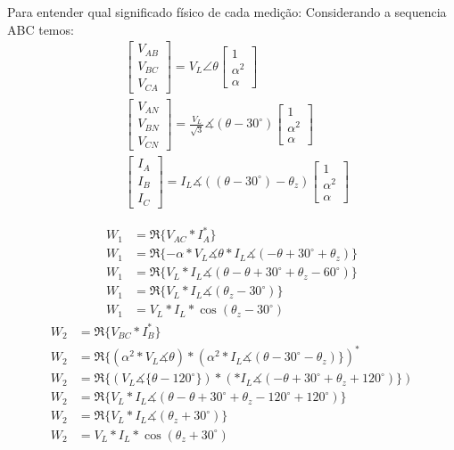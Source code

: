 \documentclass[a4paper, 12pt]{article}
\begin{document}
    Para entender qual significado físico de cada medição:
        Considerando a sequencia ABC temos:
\[ \begin{split}
&\begin{bmatrix} V_{AB}\\ V_{BC}\\ V_{CA} \end{bmatrix} = V_L \angle \theta \begin{bmatrix} 1\\  \alpha^2\\  \alpha \end{bmatrix}\\
&\begin{bmatrix} V_{AN}\\ V_{BN}\\ V_{CN} \end{bmatrix} = \frac{V_L}{\sqrt{3}} \measuredangle{( \theta-30^\circ)} \begin{bmatrix} 1\\  \alpha^2\\  \alpha \end{bmatrix} \\
&\begin{bmatrix} I_{A}\\ I_{B}\\ I_{C} \end{bmatrix} = I_L\measuredangle{(( \theta-30^\circ) - \theta_z)} \begin{bmatrix} 1\\  \alpha^2\\  \alpha \end{bmatrix}
\end{split}
\]

\[\begin{split}
W_1 &= \Re\{V_{AC} \ast I_A^\ast\}\\
W_1 &= \Re\{-\alpha \ast V_L\measuredangle{\theta} \ast I_L\measuredangle{(-\theta+30^\circ+\theta_z)}\}\\
W_1 &= \Re\{V_L\ast I_L\measuredangle{(\theta-\theta+30^\circ+\theta_z - 60^\circ)}\}\\
W_1 &= \Re\{V_L\ast I_L\measuredangle{(\theta_z - 30^\circ)}\}\\
W_1 &= V_L\ast I_L \ast \cos(\theta _z - 30^\circ)
\end{split}\]
\[
\begin{split}
    W_2 &= \Re\{V_{BC} \ast I_B^\ast\}\\
    W_2 &= \Re\{(\alpha^2 \ast V_L\measuredangle{\theta})\ast (\alpha^2 \ast I_L\measuredangle{(\theta-30^\circ-\theta_z)}\})^\ast\\
    W_2 &= \Re\{(V_L\measuredangle{\{\theta-120^\circ}\})\ast (\ast I_L\measuredangle{(-\theta+30^\circ+\theta_z+120^\circ)}\})\\
    W_2 &= \Re\{V_L\ast I_L\measuredangle{(\theta-\theta+30^\circ+\theta_z-120^\circ + 120^\circ)}\}\\
    W_2 &= \Re\{V_L\ast I_L\measuredangle{(\theta_z + 30^\circ)}\}\\
    W_2 &= V_L\ast I_L \ast \cos(\theta _z + 30^\circ)
\end{split}\]
\end{document}
